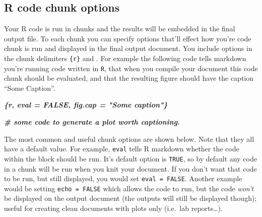 \documentclass[
]{book}
\newenvironment{Shaded}{\begin{snugshade}}{\end{snugshade}}
\newcommand{\InformationTok}[1]{\textcolor[rgb]{0.56,0.35,0.01}{\textbf{\textit{#1}}}}
\begin{document}
\hypertarget{r-code-chunk-options}{%
\subsection{R code chunk options}\label{r-code-chunk-options}}

Your R code is run in chunks and the results will be embedded in the final output file. To each chunk you can specify options that'll effect how you're code chunk is run and displayed in the final output document. You include options in the chunk delimiters \texttt{\textasciigrave{}\textasciigrave{}\textasciigrave{}\{r\}} and \texttt{\textasciigrave{}\textasciigrave{}\textasciigrave{}}. For example the following code tells markdown you're running code written in \texttt{R}, that when you compile your document this code chunk should be evaluated, and that the resulting figure should have the caption ``Some Caption''.

\begin{Shaded}
\begin{Highlighting}[]
\InformationTok{\textasciigrave{}\textasciigrave{}\textasciigrave{}\{r, eval = FALSE, fig.cap = "Some caption"\}}

\InformationTok{\# some code to generate a plot worth captioning. }

\InformationTok{\textasciigrave{}\textasciigrave{}\textasciigrave{}}
\end{Highlighting}
\end{Shaded}

The most common and useful chunk options are shown below. Note that they all have a default value. For example, \texttt{eval} tells R markdown whether the code within the block should be run. It's default option is \texttt{TRUE}, so by default any code in a chunk will be run when you knit your document. If you don't want that code to be run, but still displayed, you would set \texttt{eval\ =\ FALSE}. Another example would be setting \texttt{echo\ =\ FALSE} which allows the code to run, but the code \emph{won't} be displayed on the output document (the outputs will still be displayed though); useful for creating clean documents with plots only (i.e.~lab reports\ldots).
\end{document}
